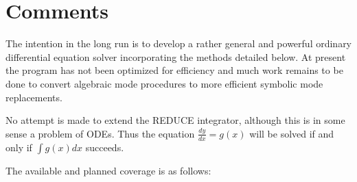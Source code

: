 \section{Comments}

The intention in the long run is to develop a rather general and
powerful ordinary differential equation solver incorporating the
methods detailed below.  At present the program has not been optimized
for efficiency and much work remains to be done to convert algebraic
mode procedures to more efficient symbolic mode replacements.

No attempt is made to extend the REDUCE integrator, although this is
in some sense a problem of ODEs.  Thus the equation $\frac{dy}{dx} = g(x)$ will
be solved if and only if $\int g(x) dx$ succeeds.

The available and planned coverage is as follows:

